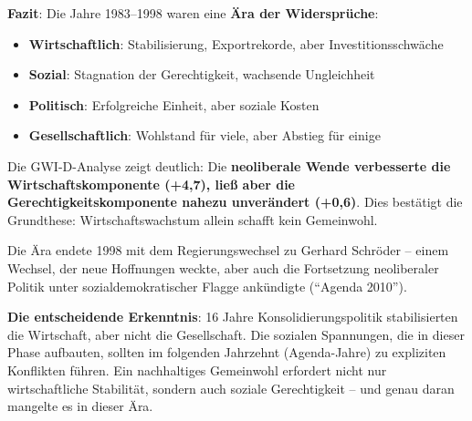 \textbf{Fazit}: Die Jahre 1983–1998 waren eine \textbf{Ära der Widersprüche}:

\begin{itemize}
    \item \textbf{Wirtschaftlich}: Stabilisierung, Exportrekorde, aber Investitionsschwäche
    \item \textbf{Sozial}: Stagnation der Gerechtigkeit, wachsende Ungleichheit
    \item \textbf{Politisch}: Erfolgreiche Einheit, aber soziale Kosten
    \item \textbf{Gesellschaftlich}: Wohlstand für viele, aber Abstieg für einige
\end{itemize}

Die GWI-D-Analyse zeigt deutlich: Die \textbf{neoliberale Wende verbesserte die Wirtschaftskomponente (+4,7), ließ aber die Gerechtigkeitskomponente nahezu unverändert (+0,6)}. Dies bestätigt die Grundthese: Wirtschaftswachstum allein schafft kein Gemeinwohl.

Die Ära endete 1998 mit dem Regierungswechsel zu Gerhard Schröder – einem Wechsel, der neue Hoffnungen weckte, aber auch die Fortsetzung
neoliberaler Politik unter sozialdemokratischer Flagge ankündigte (\enquote{Agenda 2010}). 

\textbf{Die entscheidende Erkenntnis}: 16 Jahre Konsolidierungspolitik stabilisierten die Wirtschaft, aber nicht die Gesellschaft. Die sozialen 
Spannungen, die in dieser Phase aufbauten, sollten im folgenden Jahrzehnt (Agenda-Jahre) zu expliziten Konflikten führen. Ein nachhaltiges
Gemeinwohl erfordert nicht nur wirtschaftliche Stabilität, sondern auch soziale Gerechtigkeit – und genau daran mangelte es in dieser Ära.

\endinput